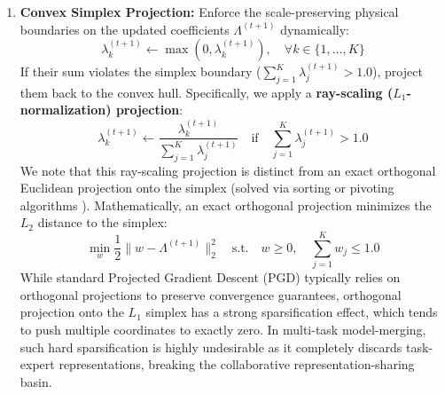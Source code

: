 \begin{enumerate}
\begin{itemize}
        \begin{equation}
            \Lambda^{(t+1)} \leftarrow \Lambda^{(t)} - \eta \nabla_\Lambda \mathcal{L}(\Lambda^{(t)})
        \end{equation}
        \item {\bf Active-Head Settings:} Compute the joint loss $\mathcal{L}(\Lambda, H)$ as defined in Equation 8. Compute the gradients with respect to both the $K$ coefficients and the classification head parameters: $\nabla_\Lambda \mathcal{L}(\Lambda^{(t)}, H^{(t)})$ and $\nabla_H \mathcal{L}(\Lambda^{(t)}, H^{(t)})$. Update both parameters concurrently:
        \begin{equation}
            \Lambda^{(t+1)} \leftarrow \Lambda^{(t)} - \eta \nabla_\Lambda \mathcal{L}(\Lambda^{(t)}, H^{(t)})
        \end{equation}
        \begin{equation}
            H^{(t+1)} \leftarrow H^{(t)} - \eta \nabla_H \mathcal{L}(\Lambda^{(t)}, H^{(t)})
        \end{equation}
    \end{itemize}
    \item {\bf Convex Simplex Projection:} Enforce the scale-preserving physical boundaries on the updated coefficients $\Lambda^{(t+1)}$ dynamically:
    \begin{equation}
        \lambda_k^{(t+1)} \leftarrow \max\left(0, \lambda_k^{(t+1)}\right), \quad \forall k \in \{1, \dots, K\}
    \end{equation}
    If their sum violates the simplex boundary ($\sum_{j=1}^K \lambda_j^{(t+1)} > 1.0$), project them back to the convex hull. Specifically, we apply a {\bf ray-scaling ($L_1$-normalization) projection}:
    \begin{equation}
        \lambda_k^{(t+1)} \leftarrow \frac{\lambda_k^{(t+1)}}{\sum_{j=1}^K \lambda_j^{(t+1)}} \quad \text{if} \quad \sum_{j=1}^K \lambda_j^{(t+1)} > 1.0
    \end{equation}
    We note that this ray-scaling projection is distinct from an exact orthogonal Euclidean projection onto the simplex (solved via sorting or pivoting algorithms \cite{duchi2008efficient}). Mathematically, an exact orthogonal projection minimizes the $L_2$ distance to the simplex:
    \begin{equation}
        \min_{w} \frac{1}{2} \|w - \Lambda^{(t+1)}\|_2^2 \quad \text{s.t.} \quad w \geq 0, \quad \sum_{j=1}^K w_j \leq 1.0
    \end{equation}
    While standard Projected Gradient Descent (PGD) typically relies on orthogonal projections to preserve convergence guarantees, orthogonal projection onto the $L_1$ simplex has a strong sparsification effect, which tends to push multiple coordinates to exactly zero. In multi-task model-merging, such hard sparsification is highly undesirable as it completely discards task-expert representations, breaking the collaborative representation-sharing basin. 
    

\end{enumerate}
